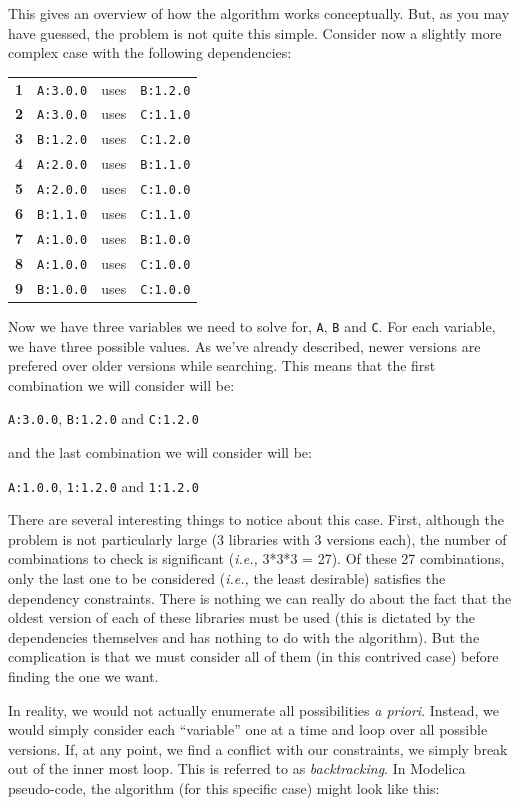 \documentclass[11pt,a4paper,twocolumn]{article}
\renewcommand{\small}{\fontsize{9.5pt}{11.1pt}\selectfont}
\newcommand{\code}[1]{\texttt{#1}} %
\begin{document}
This gives an overview of how the algorithm works conceptually.  But,
as you may have guessed, the problem is not quite this simple.
Consider now a slightly more complex case with the following
dependencies:
{\small
\begin{center}
\begin{tabular}{llcl}
  \textbf{1} &\code{A:3.0.0} &uses &\code{B:1.2.0} \\
  \textbf{2} &\code{A:3.0.0} &uses &\code{C:1.1.0}\\
  \textbf{3} &\code{B:1.2.0} &uses &\code{C:1.2.0}\\
  \textbf{4} &\code{A:2.0.0} &uses &\code{B:1.1.0}\\
  \textbf{5} &\code{A:2.0.0} &uses &\code{C:1.0.0}\\
  \textbf{6} &\code{B:1.1.0} &uses &\code{C:1.1.0}\\
  \textbf{7} &\code{A:1.0.0} &uses &\code{B:1.0.0}\\
  \textbf{8} &\code{A:1.0.0} &uses &\code{C:1.0.0}\\
  \textbf{9} &\code{B:1.0.0} &uses &\code{C:1.0.0}
\end{tabular}
\end{center}
} Now we have three variables we need to solve for, \code{A}, \code{B}
and \code{C}.  For each variable, we have three possible values.  As
we've already described, newer versions are prefered over older
versions while searching.  This means that the first combination we
will consider will be:

\code{A:3.0.0}, \code{B:1.2.0} and \code{C:1.2.0}

and the last combination we will consider will be:

\code{A:1.0.0}, \code{1:1.2.0} and \code{1:1.2.0}

There are several interesting things to notice about this case.
First, although the problem is not particularly large (3 libraries
with 3 versions each), the number of combinations to check is
significant (\emph{i.e.,} 3*3*3 = 27).  Of these 27 combinations, only
the last one to be considered (\emph{i.e.,} the least desirable)
satisfies the dependency constraints.  There is nothing we can really
do about the fact that the oldest version of each of these libraries
must be used (this is dictated by the dependencies themselves and has
nothing to do with the algorithm).  But the complication is that we
must consider all of them (in this contrived case) before finding the
one we want.

In reality, we would not actually enumerate all possibilities {\it a
  priori}.  Instead, we would simply consider each ``variable'' one at
a time and loop over all possible versions.  If, at any point, we find
a conflict with our constraints, we simply break out of the inner most
loop.  This is referred to as \emph{backtracking}.  In Modelica
pseudo-code, the algorithm (for this specific case) might look like
this:
\end{document}
